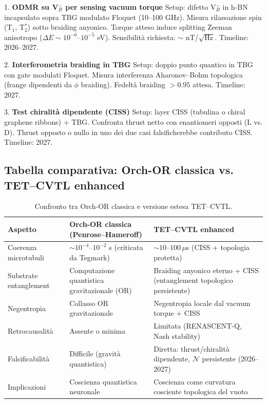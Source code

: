 \documentclass[11pt,a4paper]{article}
\theoremstyle{plain}
\theoremstyle{definition}
\begin{document}
\begin{tcolorbox}
1. \textbf{ODMR su V$_B^-$ per sensing vacuum torque}  
   Setup: difetto V$_B^-$ in h-BN incapsulato sopra TBG modulato Floquet (10–100 GHz). Misura rilassazione spin (T$_1$, T$_2^*$) sotto braiding anyonico. Torque atteso induce splitting Zeeman anisotropo ($\Delta E \sim 10^{-6}$--$10^{-5}$ eV). Sensibilità richiesta: $\sim$ nT/$\sqrt{\mathrm{Hz}}$. Timeline: 2026–2027.

2. \textbf{Interferometria braiding in TBG}  
   Setup: doppio punto quantico in TBG con gate modulati Floquet. Misura interferenza Aharonov–Bohm topologica (frange dipendenti da $\phi$ braiding). Fedeltà braiding $>0.95$ attesa. Timeline: 2027.

3. \textbf{Test chiralità dipendente (CISS)}  
   Setup: layer CISS (tubulina o chiral graphene ribbons) + TBG. Confronta thrust netto con enantiomeri opposti (L vs. D). Thrust opposto o nullo in uno dei due casi falsificherebbe contributo CISS. Timeline: 2027.

\subsection{Tabella comparativa: Orch-OR classica vs. TET--CVTL enhanced}

\begin{table}[H]
\centering
\caption{Confronto tra Orch-OR classica e versione estesa TET--CVTL.}
\small
\arrayrulewidth=0.8pt

\begin{tabularx}{\textwidth}{|l|X|X|}
\hline
\rowcolor{violet!15}
\textbf{Aspetto} & \textbf{Orch-OR classica (Penrose--Hameroff)} & \textbf{TET--CVTL enhanced} \\
\hline
\rowcolor{gray!6}
Coerenza microtubuli & $\sim 10^{-4}$--$10^{-2}$ s (criticata da Tegmark) & $\sim 10$--$100\,\mu$s (CISS + topologia protetta) \\
\hline
Substrate entanglement & Computazione quantistica gravitazionale (OR) & Braiding anyonico eterno + CISS (entanglement topologico persistente) \\
\hline
\rowcolor{gray!6}
Negentropia & Collasso OR gravitazionale & Negentropia locale dal vacuum torque + CISS \\
\hline
Retrocausalità & Assente o minima & Limitata (RENASCENT-Q, Nash stability) \\
\hline
\rowcolor{gray!6}
Falsificabilità & Difficile (gravità quantistica) & Diretta: thrust/chiralità dipendente, $\mathcal{N}$ persistente (2026--2027) \\
\hline
Implicazioni & Coscienza quantistica neuronale & Coscienza come curvatura cosciente topologica del vuoto \\
\hline
\end{tabularx}
\end{table}


\end{tcolorbox}
\end{document}

